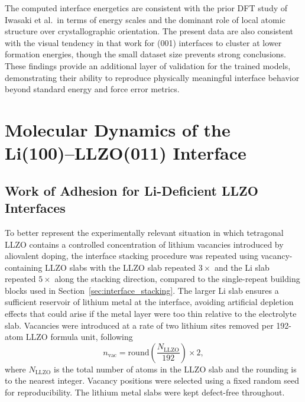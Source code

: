 \documentclass[12pt,a4paper,oneside]{book}
\begin{document}
The computed interface energetics are consistent with the prior DFT study of Iwasaki et al.\ in terms of energy scales and the dominant role of local atomic structure over crystallographic orientation. The present data are also consistent with the visual tendency in that work for (001) interfaces to cluster at lower formation energies, though the small dataset size prevents strong conclusions. These findings provide an additional layer of validation for the trained models, demonstrating their ability to reproduce physically meaningful interface behavior beyond standard energy and force error metrics.





\section{Molecular Dynamics of the Li(100)--LLZO(011) Interface}

\subsection{Work of Adhesion for Li-Deficient LLZO Interfaces}
\label{sec:wad_vacancy}

To better represent the experimentally relevant situation in which tetragonal LLZO
contains a controlled concentration of lithium vacancies introduced by aliovalent
doping, the interface stacking procedure was repeated using vacancy-containing
LLZO slabs with the LLZO slab repeated $3\times$ and the Li slab repeated
$5\times$ along the stacking direction, compared to the single-repeat
building blocks used in Section~\ref{sec:interface_stacking}. The larger
Li slab ensures a sufficient reservoir of lithium metal at the interface,
avoiding artificial depletion effects that could arise if the metal layer
were too thin relative to the electrolyte slab.
Vacancies were introduced at a rate of two lithium sites removed per
192-atom LLZO formula unit, following
\begin{equation}
    n_{\mathrm{vac}} = \mathrm{round}\!\left(\frac{N_{\mathrm{LLZO}}}{192}\right) \times 2,
\end{equation}
where $N_{\mathrm{LLZO}}$ is the total number of atoms in the LLZO slab and the
rounding is to the nearest integer. Vacancy positions were selected using a fixed
random seed for reproducibility. The lithium metal slabs were kept defect-free
throughout.
\end{document}
